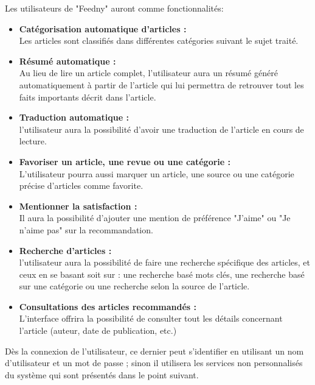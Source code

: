 \begin{enumerate}[leftmargin=*]
        Les utilisateurs de "Feedny" auront comme fonctionnalités:  
        \begin{itemize}
            \item \textbf{Catégorisation automatique d'articles :}\\
            Les articles sont classifiés dans différentes catégories suivant le sujet traité.
            \item \textbf{Résumé automatique :}\\
            Au lieu de lire un article complet, l'utilisateur aura un résumé généré automatiquement à partir de l'article qui lui permettra de retrouver tout les faits importants décrit dans l'article.
            \item \textbf{Traduction automatique :}\\
            l'utilisateur aura la possibilité d'avoir une traduction de l'article en cours de lecture.
            \item \textbf{Favoriser un article, une revue ou une catégorie :}\\
            L'utilisateur pourra aussi marquer un article, une source ou une catégorie précise d'articles comme favorite.
            \item \textbf{Mentionner la satisfaction :}\\
            Il aura la possibilité d'ajouter une mention de préférence "J'aime" ou "Je n'aime pas" sur la recommandation.
            \item \textbf{Recherche d'articles :}\\
            l'utilisateur aura la possibilité de faire une recherche spécifique des articles, et ceux en se basant soit sur : une recherche basé mots clés, une recherche basé sur une catégorie ou une recherche selon la source de l'article. 
            \item \textbf{Consultations des articles recommandés :}\\
            L'interface offrira la possibilité de consulter tout les détails concernant l'article (auteur, date de publication, etc.) 
        \end{itemize}
        Dès la connexion de l'utilisateur, ce dernier peut s'identifier en utilisant un nom d'utilisateur et un mot de passe ; sinon il utilisera les services non personnalisés du système qui sont présentés dans le point suivant.\\


\end{enumerate}
